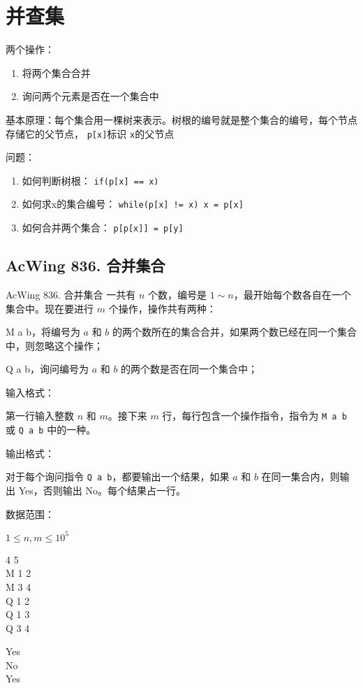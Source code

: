 \section{并查集}

两个操作：

\begin{enumerate}
    \item 将两个集合合并
    \item 询问两个元素是否在一个集合中
\end{enumerate}

基本原理：每个集合用一棵树来表示。树根的编号就是整个集合的编号，每个节点存储它的父节点， \lstinline{p[x]}标识 \lstinline{x}的父节点

问题：

\begin{enumerate}
    \item 如何判断树根： \lstinline{if(p[x] == x)}
    \item 如何求x的集合编号： \lstinline{while(p[x] != x) x = p[x]}
    \item 如何合并两个集合： \lstinline{p[p[x]] = p[y]}
\end{enumerate}

\subsection{AcWing 836. 合并集合}

\begin{titledbox}{AcWing 836. 合并集合}
    一共有 $n$ 个数，编号是 $1 \sim n$，最开始每个数各自在一个集合中。现在要进行 $m$ 个操作，操作共有两种：

    M a b，将编号为 $a$ 和 $b$ 的两个数所在的集合合并，如果两个数已经在同一个集合中，则忽略这个操作；

    Q a b，询问编号为 $a$ 和 $b$ 的两个数是否在同一个集合中；

    输入格式：

    第一行输入整数 $n$ 和 $m$。接下来 $m$ 行，每行包含一个操作指令，指令为 \lstinline{M a b} 或 \lstinline{Q a b} 中的一种。

    输出格式：

    对于每个询问指令 \lstinline{Q a b}，都要输出一个结果，如果 $a$ 和 $b$ 在同一集合内，则输出 Yes，否则输出 No。每个结果占一行。

    数据范围：

    $1 \le n,m \le 10^5$

    \begin{inputblock}
        4 5 \\
        M 1 2 \\
        M 3 4 \\
        Q 1 2 \\
        Q 1 3 \\
        Q 3 4
    \end{inputblock}
    \begin{outputblock}
        Yes \\
        No \\
        Yes
    \end{outputblock}
\end{titledbox}

